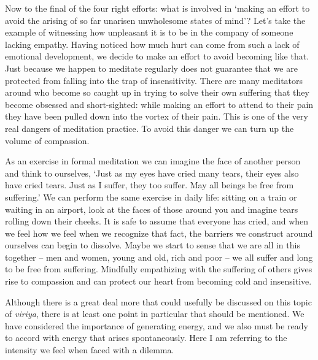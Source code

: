 Now to the final of the four right efforts: what is involved in `making
an effort to avoid the arising of so far unarisen unwholesome states of
mind'? Let's take the example of witnessing how unpleasant it is to be
in the company of someone lacking empathy. Having noticed how much hurt
can come from such a lack of emotional development, we decide to make an
effort to avoid becoming like that. Just because we happen to meditate
regularly does not guarantee that we are protected from falling into the
trap of insensitivity. There are many meditators around who become so
caught up in trying to solve their own suffering that they become
obsessed and short-sighted: while making an effort to attend to their
pain they have been pulled down into the vortex of their pain. This is
one of the very real dangers of meditation practice. To avoid this
danger we can turn up the volume of compassion.

As an exercise in formal meditation we can imagine the face of another
person and think to ourselves, `Just as my eyes have cried many tears,
their eyes also have cried tears. Just as I suffer, they too suffer. May
all beings be free from suffering.' We can perform the same exercise in
daily life: sitting on a train or waiting in an airport, look at the
faces of those around you and imagine tears rolling down their cheeks.
It is safe to assume that everyone has cried, and when we feel how we
feel when we recognize that fact, the barriers we construct around
ourselves can begin to dissolve. Maybe we start to sense that we are all
in this together -- men and women, young and old, rich and poor -- we all
suffer and long to be free from suffering. Mindfully empathizing with
the suffering of others gives rise to compassion and can protect our
heart from becoming cold and insensitive.

Although there is a great deal more that could usefully be discussed on
this topic of \emph{viriya}, there is at least one point in particular that
should be mentioned. We have considered the importance of generating
energy, and we also must be ready to accord with energy that arises
spontaneously. Here I am referring to the intensity we feel when faced
with a dilemma.

